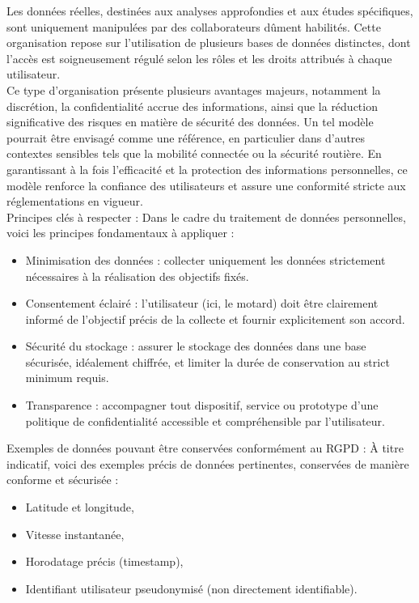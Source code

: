 Les données réelles, destinées aux analyses approfondies et aux études spécifiques, sont uniquement manipulées par des collaborateurs dûment habilités. Cette organisation repose sur l'utilisation de plusieurs bases de données distinctes, dont l'accès est soigneusement régulé selon les rôles et les droits attribués à chaque utilisateur.\\
Ce type d'organisation présente plusieurs avantages majeurs, notamment la discrétion, la confidentialité accrue des informations, ainsi que la réduction significative des risques en matière de sécurité des données. Un tel modèle pourrait être envisagé comme une référence, en particulier dans d'autres contextes sensibles tels que la mobilité connectée ou la sécurité routière. En garantissant à la fois l'efficacité et la protection des informations personnelles, ce modèle renforce la confiance des utilisateurs et assure une conformité stricte aux réglementations en vigueur.\\

Principes clés à respecter :
Dans le cadre du traitement de données personnelles, voici les principes fondamentaux à appliquer :
\begin{itemize}
\item Minimisation des données : collecter uniquement les données strictement nécessaires à la réalisation des objectifs fixés.
\item Consentement éclairé : l'utilisateur (ici, le motard) doit être clairement informé de l'objectif précis de la collecte et fournir explicitement son accord.
\item Sécurité du stockage : assurer le stockage des données dans une base sécurisée, idéalement chiffrée, et limiter la durée de conservation au strict minimum requis.
\item Transparence : accompagner tout dispositif, service ou prototype d'une politique de confidentialité accessible et compréhensible par l'utilisateur.
\end{itemize}

Exemples de données pouvant être conservées conformément au RGPD :
À titre indicatif, voici des exemples précis de données pertinentes, conservées de manière conforme et sécurisée :
\begin{itemize}
\item Latitude et longitude,
\item Vitesse instantanée,
\item Horodatage précis (timestamp),
\item Identifiant utilisateur pseudonymisé (non directement identifiable).
\end{itemize}

